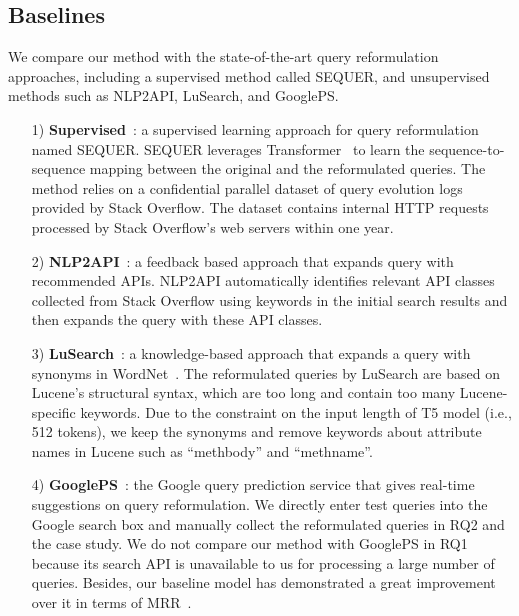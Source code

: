 \documentclass[sigconf,screen]{acmart}
\newcommand{\eg}{\hbox{e.g.}\xspace}
\newcommand{\ie}{\hbox{i.e.}\xspace}
\begin{document}
\subsection{Baselines}
We compare our method with the state-of-the-art query reformulation approaches, including a supervised method called SEQUER, and unsupervised methods such as NLP2API, LuSearch, and GooglePS. 
\begin{itemize}
\item[1)] \textbf{Supervised}~\cite{sequer}: a supervised learning approach for query reformulation named SEQUER. SEQUER leverages Transformer~\cite{vaswani2017attention} to learn the sequence-to-sequence mapping between the original and the reformulated queries. The method relies on a confidential parallel dataset of query evolution logs provided by Stack Overflow. The dataset contains internal HTTP requests processed by Stack Overflow’s web servers within one year. %
\item[2)] \textbf{NLP2API}~\cite{nlp2api}: a feedback based approach that expands query with recommended APIs.
NLP2API automatically identifies relevant API classes collected from Stack Overflow using keywords in the initial search results and then expands the query with these API classes.
\item[3)] \textbf{LuSearch}~\cite{lusearch}: a knowledge-based approach that expands a query with synonyms in WordNet~\cite{WordNet}. The reformulated queries by LuSearch are based on Lucene's structural syntax, which are too long and contain too many Lucene-specific keywords. 
Due to the constraint on the input length of T5 model (\ie, 512 tokens), we keep the synonyms and remove keywords about attribute names in Lucene such as ``methbody'' and ``methname''.
\item[4)] \textbf{GooglePS}~\cite{GooglePS}: the Google query prediction service that gives real-time suggestions on query reformulation. We directly enter test queries into the Google search box and manually collect the reformulated queries in RQ2 and the case study. We do not compare our method with GooglePS in RQ1 because its search API is unavailable to us for processing a large number of queries. Besides, our baseline model has demonstrated a great improvement over it in terms of MRR~\cite{sequer}.

\end{itemize}
\end{document}
